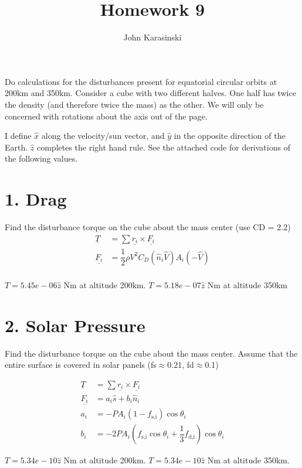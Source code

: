 \documentclass[onecolumn,10pt]{jhwhw}
\author{John Karasinski}
\title{Homework 9}
\begin{document}

Do calculations for the disturbances present for equatorial circular orbits at 200km and 350km. Consider a cube with two different halves. One half has twice the density (and therefore twice the mass) as the other. We will only be concerned with rotations about the axis out of the page.

I define $\hat{x}$ along the velocity/sun vector, and $\hat{y}$ in the opposite direction of the Earth. $\hat{z}$ completes the right hand rule. See the attached code for derivations of the following values.

\part{1. Drag}
Find the disturbance torque on the cube about the mass center (use CD = 2.2)
\begin{align*}
\underline{T} &= \sum \underline{r_i} \times \underline{F_i} \\
\underline{F_i} &= \dfrac{1}{2} \rho V^2 C_D \left( \hat{n}_i \hat{V} \right) A_i \left( - \hat{V} \right) \\
\end{align*}

$T = 5.45e-06 \hat{z}$ Nm at altitude 200km. $T = 5.18e-07 \hat{z}$ Nm at altitude 350km

\part{2. Solar Pressure}
Find the disturbance torque on the cube about the mass center. Assume that the entire surface is covered in solar panels (fs$\approx$0.21, fd$\approx$0.1)

\begin{align*}
\underline{T} &= \sum \underline{r_i} \times \underline{F_i} \\
\underline{F_i} &= a_i \hat{s} + b_i \hat{n}_i \\
a_i &= -PA_i \left(1-f_{\mbox{s,i}} \right) \cos{\theta_i} \\
b_i &= -2PA_i \left(f_{\mbox{s,i}} \cos{\theta_i} + \dfrac{1}{3} f_{\mbox{d,i}} \right) \cos{\theta_i}
\end{align*}

$T = 5.34e-10 \hat{z}$ Nm at altitude 200km. $T = 5.34e-10 \hat{z}$ Nm at altitude 350km.
\end{document}
